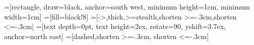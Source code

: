 =[rectangle, draw=black, anchor=south west, minimum height=1cm, minimum width=1cm]
=[fill=black!8]
=[->,thick,>=stealth,shorten >=-.3cm,shorten <=-.3cm]
=[text depth=0pt, text height=2ex, rotate=90, yshift=3.7ex, anchor=north east]
=[dashed,shorten >=-.3cm, shorten <=-.3cm]